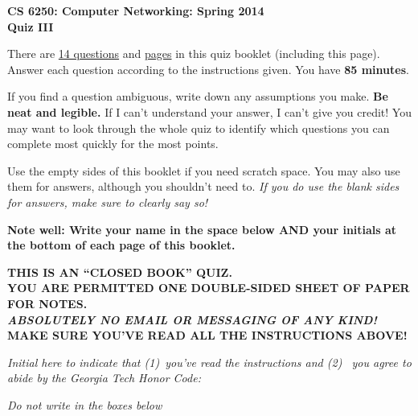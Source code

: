 \documentclass[11pt]{article}
\begin{document}
\begin{center}
{\Large{\bf CS 6250: Computer Networking: Spring 2014} \\
 \vspace{.15in} \Huge{\bf Quiz III}} 

\begin{boxedminipage}[h]{6in}
There are \underline{14 questions} and \underline{\pageref{lastpage}
  pages} in this quiz booklet (including this page).  Answer each
question according to the instructions given.  You have {\bf 85
  minutes}.



\vspace{.1in} 
If you find a question ambiguous, write down any
assumptions you make.  {\bf Be neat and legible.}  If I can't
understand your answer, I can't give you credit!  You may want to look
through the whole quiz to identify which questions you can complete most
quickly for the most points.

\vspace{.1in} 
Use the empty sides of this booklet if you need scratch space.  You
may also use them for answers, although you shouldn't need to.  {\em If you
do use the blank sides for answers, make sure to clearly say so!}

\vspace{.1in} 
{\bf Note well: Write your name in the space below AND your initials at the bottom of each
page of this booklet.}

\begin{center}{\bf THIS IS AN ``CLOSED BOOK'' QUIZ.\\
YOU ARE PERMITTED ONE DOUBLE-SIDED SHEET OF PAPER FOR NOTES.\\
{\em ABSOLUTELY NO EMAIL OR MESSAGING OF ANY KIND!} \\
MAKE SURE YOU'VE READ ALL THE INSTRUCTIONS ABOVE!}
\end{center}
{\em Initial here to indicate that (1)~you've read the instructions and (2)~
you agree to abide by the Georgia Tech Honor Code: }


\end{boxedminipage}
\end{center}
\vspace*{0.25in}
\begin{center}
{\it Do not write in the boxes below}
\end{center}
\end{document}
